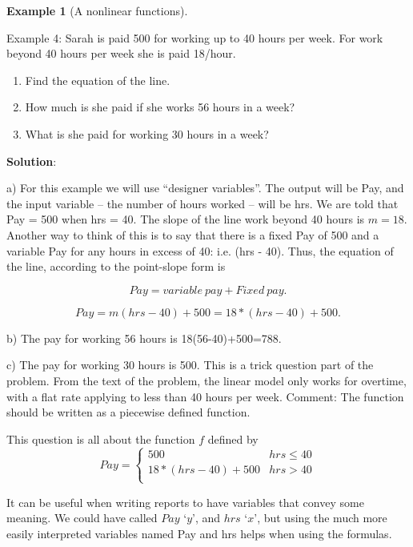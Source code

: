 \documentclass[10pt,]{book}
\newcommand{\terminology}[1]{\textbf{#1}}
\theoremstyle{plain}
\theoremstyle{definition}
\newtheorem{example}[theorem]{Example}
\newenvironment{assemblage-untitled}{\mdfsetup{%
roundcorner=2ex, backgroundcolor=blue!5,linecolor=blue!75!black,}%
\begin{mdframed}}{\end{mdframed}}
\theoremstyle{definition}
\begin{document}
\begin{example}[A nonlinear functions]\label{example-4}

Example 4:  Sarah is paid \textdollar{}500 for working up to 40 hours per week.  For work beyond 40 hours per week she is paid \textdollar{}18/hour.%
\leavevmode%
\begin{enumerate}[label=(\alph*)]
\item\hypertarget{li-20}{}Find the equation of the line.%
\item\hypertarget{li-21}{}How much is she paid if she works 56 hours in a week?%
\item\hypertarget{li-22}{}What is she paid for working 30 hours in a week?%
\end{enumerate}
\par
\terminology{Solution}:%
\par
	a) For this example we will use “designer variables”. The output will be Pay, and the input variable – the number of hours worked – will be hrs. We are told that Pay = 500 when hrs = 40. The slope of the line work beyond 40 hours is \(m=18\).  Another way to think of this is to say that there is a fixed Pay of \textdollar{}500 and a variable Pay for any hours in excess of 40: i.e. (hrs - 40). Thus, the equation of the line, according to the point-slope form is 
                    \begin{assemblage-untitled}\label{PayEquations}
\begin{equation*}Pay=variable\  pay+Fixed\  pay.\end{equation*}%
\end{assemblage-untitled}



\begin{equation*}Pay=m(hrs-40)+500=18*(hrs-40)+500.\end{equation*}%
\par
b) The pay for working 56 hours is 18(56-40)+500=\textdollar{}788.%
\par
c) The pay for working 30 hours is \textdollar{}500.  This is a trick question part of the problem.  From the text of the problem, the linear model only works for overtime, with a flat rate applying to less than 40 hours per week.
Comment: The function should be written as a piecewise defined function.%
\par
This question is all about the function \(f\) defined by \begin{equation*}Pay=\begin{cases}
500&hrs\le 40\\
18*(hrs-40)+500&hrs>40\\
\end{cases}\end{equation*}%
\end{example}
\par
It can be useful when writing reports to have variables that convey some meaning. We could have called \(Pay\) `\(y\)', and \(hrs\) `\(x\)', but using the much more easily interpreted variables named Pay and hrs helps when using the formulas.
%
\typeout{************************************************}
\typeout{************************************************}
\end{document}
